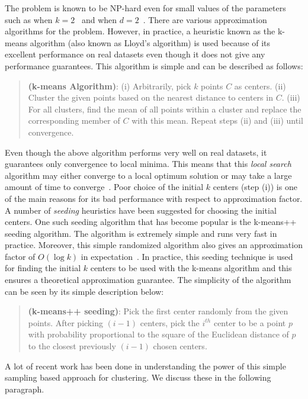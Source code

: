 \documentclass[11pt]{article}
\begin{document}
The problem is known to be NP-hard even for small values of the parameters such as when $k=2$~\cite{d07} and when $d=2$~\cite{v09,mnv12}.
There are various approximation algorithms for the problem.
However, in practice, a heuristic known as the k-means algorithm (also known as Lloyd's algorithm) is used because of its excellent performance on real datasets even though it does not give any performance guarantees. 
This algorithm is simple and can be described as follows: 
\begin{quote}
{\bf (k-means Algorithm)}: (i) Arbitrarily, pick $k$ points $C$ as centers. (ii) Cluster the given points based on the nearest distance to centers in $C$. (iii) For all clusters, find the mean of all points within a cluster and replace the corresponding member of $C$ with this mean. Repeat steps (ii) and (iii) until convergence.
\end{quote}

Even though the above algorithm performs very well on real datasets, it guarantees only convergence to local minima.
This means that this {\em local search} algorithm may either converge to a local optimum solution or may take a large amount of time to converge~\cite{ArthurV06,ArthurV06b}. 
Poor choice of the initial $k$ centers (step (i)) is one of the main reasons for its bad performance with respect to approximation factor. 
A number of {\em seeding} heuristics have been suggested for choosing the initial centers. 
One such seeding algorithm that has become popular is the k-means++ seeding algorithm.
The algorithm is extremely simple and runs very fast in practice.
Moreover, this simple randomized algorithm also gives an approximation factor of $O(\log{k})$ in expectation~\cite{ArthurV07}.
In practice, this seeding technique is used for finding the initial $k$ centers to be used with the k-means algorithm and this ensures a theoretical approximation guarantee.
The simplicity of the algorithm can be seen by its simple description below:
\begin{quote}
{\bf (k-means++ seeding)}: Pick the first center randomly from the given points. 
After picking $(i-1)$ centers, pick the $i^{th}$ center to be a point $p$ with probability proportional to the square of the Euclidean distance of $p$ to the closest previously $(i-1)$ chosen centers.
\end{quote}

A lot of recent work has been done in understanding the power of this simple sampling based approach for clustering.
We discuss these in the following paragraph.
\end{document}
